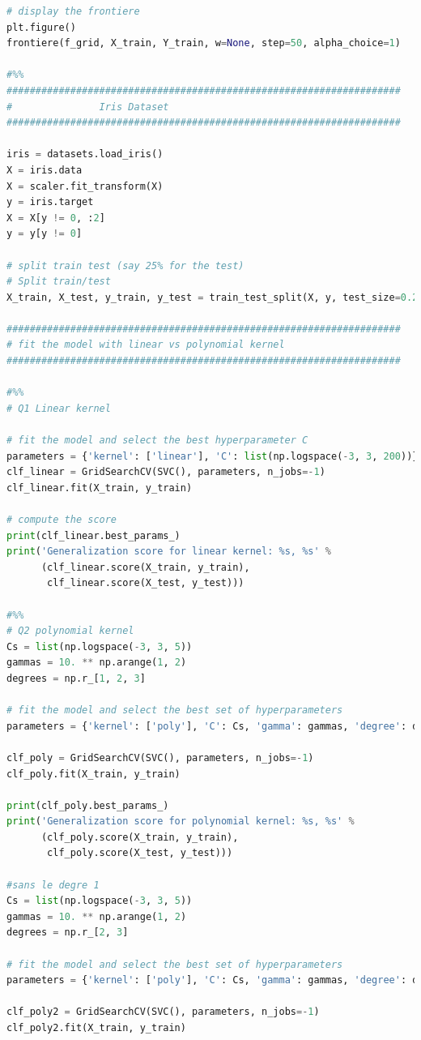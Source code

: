 \documentclass{book}
\begin{document}
\begin{lstlisting}[language=Python, caption=Code python complet]
# display the frontiere
plt.figure()
frontiere(f_grid, X_train, Y_train, w=None, step=50, alpha_choice=1)

#%%
####################################################################
#               Iris Dataset
####################################################################

iris = datasets.load_iris()
X = iris.data
X = scaler.fit_transform(X)
y = iris.target
X = X[y != 0, :2]
y = y[y != 0]

# split train test (say 25% for the test)
# Split train/test
X_train, X_test, y_train, y_test = train_test_split(X, y, test_size=0.25, random_state=42, shuffle=True)

####################################################################
# fit the model with linear vs polynomial kernel
####################################################################

#%%
# Q1 Linear kernel

# fit the model and select the best hyperparameter C
parameters = {'kernel': ['linear'], 'C': list(np.logspace(-3, 3, 200))}
clf_linear = GridSearchCV(SVC(), parameters, n_jobs=-1)
clf_linear.fit(X_train, y_train)

# compute the score
print(clf_linear.best_params_)
print('Generalization score for linear kernel: %s, %s' %
      (clf_linear.score(X_train, y_train),
       clf_linear.score(X_test, y_test)))

#%%
# Q2 polynomial kernel
Cs = list(np.logspace(-3, 3, 5))
gammas = 10. ** np.arange(1, 2)
degrees = np.r_[1, 2, 3]

# fit the model and select the best set of hyperparameters
parameters = {'kernel': ['poly'], 'C': Cs, 'gamma': gammas, 'degree': degrees}

clf_poly = GridSearchCV(SVC(), parameters, n_jobs=-1)
clf_poly.fit(X_train, y_train)

print(clf_poly.best_params_)
print('Generalization score for polynomial kernel: %s, %s' %
      (clf_poly.score(X_train, y_train),
       clf_poly.score(X_test, y_test)))

#sans le degre 1
Cs = list(np.logspace(-3, 3, 5))
gammas = 10. ** np.arange(1, 2)
degrees = np.r_[2, 3]

# fit the model and select the best set of hyperparameters
parameters = {'kernel': ['poly'], 'C': Cs, 'gamma': gammas, 'degree': degrees}

clf_poly2 = GridSearchCV(SVC(), parameters, n_jobs=-1)
clf_poly2.fit(X_train, y_train)


\end{lstlisting}
\end{document}
